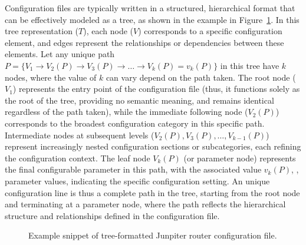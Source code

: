     Configuration files are typically written in a structured, hierarchical format that can be effectively modeled as a tree, as shown in the example in Figure~\ref{fig:tree}. In this tree representation (\(T\)), each node (\(V\)) corresponds to a specific configuration element, and edges represent the relationships or dependencies between these elements. Let any unique path \(
P = \{ V_1 \rightarrow V_2(P) \rightarrow V_3(P) \rightarrow \dots \rightarrow V_k(P) = v_k(P) \}
\) in this tree have \(k\) nodes, where the value of \(k\) can vary depend on the path taken. The root node (\(V_1\)) represents the entry point of the configuration file (thus, it functions solely as the root of the tree, providing no semantic meaning, and remains identical regardless of the path taken), while the immediate following node (\(V_2(P)\)) corresponds to the broadest configuration category in this specific path. Intermediate nodes at subsequent levels (\( V_2(P), V_3(P), \dots, V_{k-1}(P) \)) represent increasingly nested configuration sections or subcategories, each refining the configuration context. The leaf node \(V_k(P)\) (or parameter node) represents the final configurable parameter in this path, with the associated value \(v_k(P)\), \ie, parameter values, indicating the specific configuration setting. An unique configuration line is thus a complete path in the tree, starting from the root node and terminating at a parameter node, where the path reflects the hierarchical structure and relationships defined in the configuration file.
\begin{figure}[t]
    \centering
    \caption{Example snippet of tree-formatted Junpiter router configuration file.}
    \label{fig:tree}
\end{figure}

